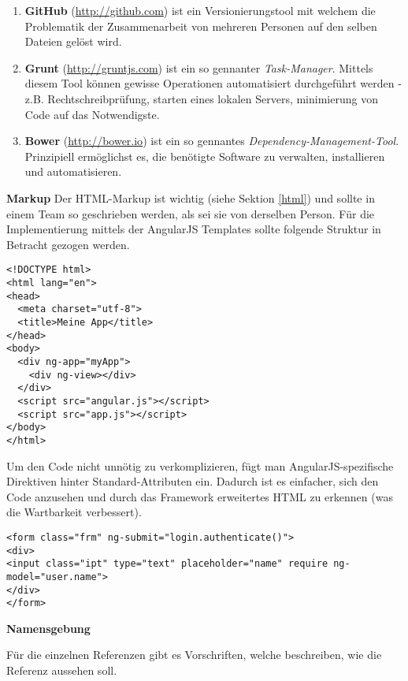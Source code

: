 \begin{enumerate}
\item \textbf{GitHub} (\url{http://github.com}) ist ein Versionierungstool mit welchem die Problematik der Zusammenarbeit von mehreren Personen auf den selben Dateien gelöst wird.
\item \textbf{Grunt} (\url{http://gruntjs.com}) ist ein so gennanter \textit{Task-Manager}. Mittels diesem Tool können gewisse Operationen automatisiert durchgeführt werden - z.B. Rechtschreibprüfung, starten eines lokalen Servers, minimierung von Code auf das Notwendigste.
\item \textbf{Bower} (\url{http://bower.io}) ist ein so gennantes \textit{Dependency-Management-Tool}. Prinzipiell ermöglichst es, die benötigte Software zu verwalten, installieren und automatisieren.
\end{enumerate}


\clearpage

\textbf{Markup\newline}
Der HTML-Markup ist wichtig (siehe Sektion \ref{html}) und sollte in einem Team so geschrieben werden, als sei sie von derselben Person. Für die Implementierung mittels der AngularJS Templates sollte folgende Struktur in Betracht gezogen werden.

\begin{lstlisting}
<!DOCTYPE html>
<html lang="en">
<head>
  <meta charset="utf-8">
  <title>Meine App</title>
</head>
<body>
  <div ng-app="myApp">
    <div ng-view></div>
  </div>
  <script src="angular.js"></script>
  <script src="app.js"></script>
</body>
</html>
\end{lstlisting}


Um den Code nicht unnötig zu verkomplizieren, fügt man AngularJS-spezifische Direktiven hinter Standard-Attributen ein. Dadurch ist es einfacher, sich den Code anzusehen und durch das Framework erweitertes HTML zu erkennen (was die Wartbarkeit verbessert).

\begin{lstlisting}
<form class="frm" ng-submit="login.authenticate()">
<div>
<input class="ipt" type="text" placeholder="name" require ng-model="user.name">
</div>
</form>
\end{lstlisting}


\textbf{Namensgebung\newline}

Für die einzelnen Referenzen gibt es Vorschriften, welche beschreiben, wie die Referenz aussehen soll.


